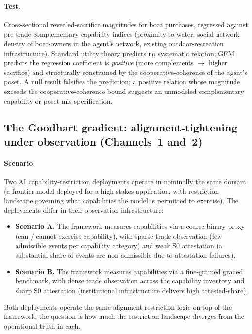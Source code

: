 \paragraph{Test.}
Cross-sectional revealed-sacrifice magnitudes for boat
purchases, regressed against pre-trade
complementary-capability indices (proximity to water,
social-network density of boat-owners in the agent's network,
existing outdoor-recreation infrastructure).  Standard utility
theory predicts no systematic relation; GFM predicts the
regression coefficient is \emph{positive} (more complements
$\to$ higher sacrifice) and structurally constrained by the
cooperative-coherence of the agent's poset.  A null result
falsifies the prediction; a positive relation whose magnitude
exceeds the cooperative-coherence bound suggests an unmodeled
complementary capability or poset mis-specification.

\subsection{The Goodhart gradient: alignment-tightening under observation (Channels~1 and~2)}
\label{sec:wex_goodhart_gradient}

\paragraph{Scenario.}
Two AI capability-restriction deployments operate in nominally
the same domain (a frontier model deployed for a high-stakes
application, with restriction landscape governing what
capabilities the model is permitted to exercise).  The
deployments differ in their observation infrastructure:
\begin{itemize}
\item \textbf{Scenario A.}  The framework measures capabilities
  via a coarse binary proxy (can / cannot exercise capability),
  with sparse trade observation (few admissible events per
  capability category) and weak S0 attestation (a substantial
  share of events are non-admissible due to attestation
  failures).
\item \textbf{Scenario B.}  The framework measures capabilities
  via a fine-grained graded benchmark, with dense trade
  observation across the capability inventory and sharp S0
  attestation (institutional infrastructure delivers high
  attested-share).
\end{itemize}
Both deployments operate the same alignment-restriction logic
on top of the framework; the question is how much the
restriction landscape diverges from the operational truth in
each.

